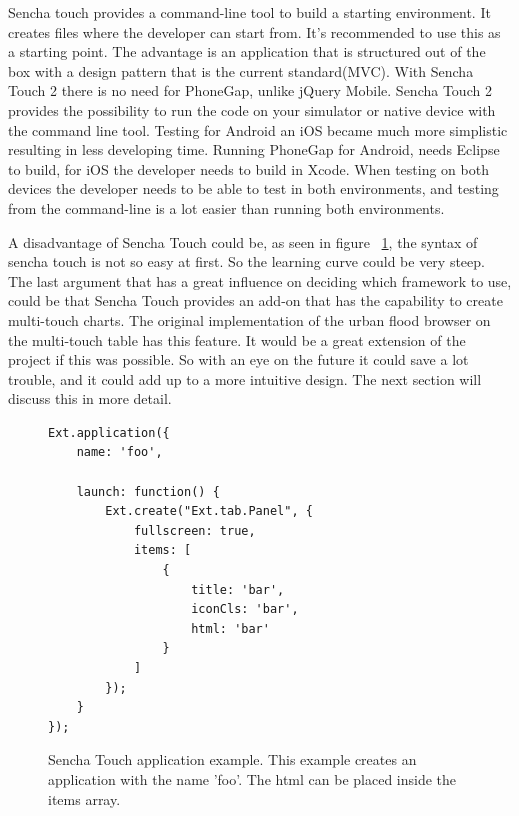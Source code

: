 \begin{description}
Sencha touch provides a command-line tool to build a starting environment. It creates files where the developer can start from. It's recommended to use this as a starting point. The advantage is an application that is structured out of the box with a design pattern that is the current standard(MVC). With Sencha Touch 2 there is no need for PhoneGap, unlike jQuery Mobile. Sencha Touch 2 provides the possibility to run the code on your simulator or native device with the command line tool. Testing for Android an iOS became much more simplistic resulting in less developing time. Running PhoneGap for Android, needs Eclipse to build, for iOS the developer needs to build in Xcode. When testing on both devices the developer needs to be able to test in both environments, and testing from the command-line is a lot easier than running both environments. 

A disadvantage of Sencha Touch could be, as seen in figure ~\ref{fig:sencha}, the syntax of sencha touch is not so easy at first. So the learning curve could be very steep.
The last argument that has a great influence on deciding which framework to use, could be that Sencha Touch provides an add-on that has the capability to create multi-touch charts. The original implementation of the urban flood browser on the multi-touch table has this feature. It would be a great extension of the project if this was possible. So with an eye on the future it could save a lot trouble, and it could add up to a more intuitive design. The next section will discuss this in more detail.

\begin{figure}[h!]
\begin{lstlisting}
Ext.application({
    name: 'foo',

    launch: function() {
        Ext.create("Ext.tab.Panel", {
            fullscreen: true,
            items: [
                {
                    title: 'bar',
                    iconCls: 'bar',
                    html: 'bar'
                }
            ]
        });
    }
});
\end{lstlisting}
\caption{Sencha Touch application example. This example creates an application with the name 'foo'.  The html can be placed inside the items array. }
\label{fig:sencha}
\end{figure}
\end{description}


